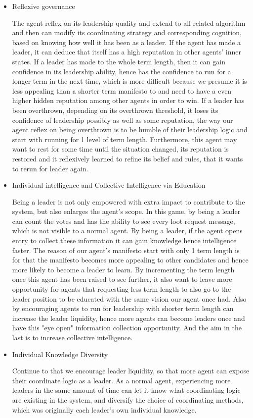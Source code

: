 \begin{itemize}
    \item Reflexive governance

          The agent reflex on its leadership quality and extend to all related algorithm and then can modify its coordinating strategy and corresponding cognition, based on knowing how well it has been as a leader. If the agent has made a leader, it can deduce that itself has a high reputation in other agents' inner states. If a leader has made to the whole term length, then it can gain confidence in its leadership ability, hence has the confidence to run for a longer term in the next time, which is more difficult because we presume it is less appealing than a shorter term manifesto to and need to have a even higher hidden reputation among other agents in order to win. If a leader has been overthrown, depending on its overthrown threshold, it loses its confidence of leadership possibly as well as some reputation, the way our agent reflex on being overthrown is to be humble of their leadership logic and start with running for 1 level of term length. Furthermore, this agent may want to rest for some time until the situation changed, its reputation is restored and it reflexively learned to refine its belief and rules, that it wants to rerun for leader again.
    \item Individual intelligence and Collective Intelligence via Education

          Being  a leader is not only empowered with extra impact to contribute to the system, but also enlarges the agent's scope. In this game, by being a leader can count the votes and has the ability to see every loot request message, which is not visible to a normal agent. By being a leader, if the agent opens entry to collect these information it can gain knowledge hence intelligence  faster. The reason of our agent's manifesto start with only 1 term length is for that the manifesto becomes more appealing to other candidates and hence more likely to become a leader to learn. By incrementing the term length once this agent has been raised to see further, it also want to leave more opportunity for agents that requesting less term length to also go to the leader position to be educated with the same vision our agent once had. Also by encouraging agents to run for leadership with shorter term length can increase the leader liquidity, hence more agents can become leaders once and have this "eye open" information collection opportunity. And the aim in the last is to increase collective intelligence.
    \item Individual Knowledge Diversity

          Continue to that we encourage leader liquidity, so that more agent can expose their coordinate logic as a leader. As a normal agent, experiencing more leaders in the same amount of time can let it know what coordinating logic are existing in the system, and diversify the choice of coordinating methods, which was originally each leader's own individual knowledge.
\end{itemize}

